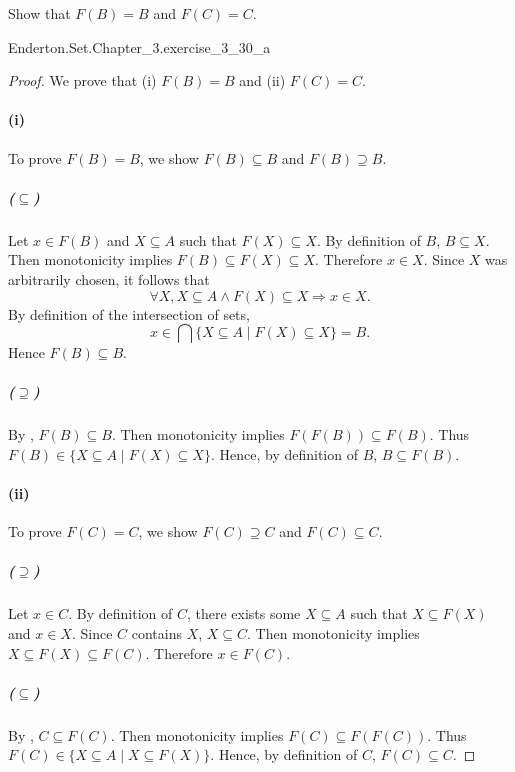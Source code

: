 \documentclass{report}
\begin{document}
  Show that $F(B) = B$ and $F(C) = C$.

    {Enderton.Set.Chapter\_3.exercise\_3\_30\_a}

  \begin{proof}

    We prove that (i) $F(B) = B$ and (ii) $F(C) = C$.

    \paragraph{(i)}%

      To prove $F(B) = B$, we show $F(B) \subseteq B$ and $F(B) \supseteq B$.

      \subparagraph{($\subseteq$)}%

        Let $x \in F(B)$ and $X \subseteq A$ such that $F(X) \subseteq X$.
        By definition of $B$, $B \subseteq X$.
        Then monotonicity implies $F(B) \subseteq F(X) \subseteq X$.
        Therefore $x \in X$.
        Since $X$ was arbitrarily chosen, it follows that
          $$\forall X, X \subseteq A \land F(X) \subseteq X \Rightarrow
            x \in X.$$
        By definition of the intersection of sets,
          $$x \in \bigcap\{X \subseteq A \mid F(X) \subseteq X\} = B.$$
        Hence $F(B) \subseteq B$.

      \subparagraph{($\supseteq$)}%

        By , $F(B) \subseteq B$.
        Then monotonicity implies $F(F(B)) \subseteq F(B)$.
        Thus $F(B) \in \{X \subseteq A \mid F(X) \subseteq X\}$.
        Hence, by definition of $B$, $B \subseteq F(B)$.

    \paragraph{(ii)}%

      To prove $F(C) = C$, we show $F(C) \supseteq C$ and $F(C) \subseteq C$.

      \subparagraph{($\supseteq$)}%

        Let $x \in C$.
        By definition of $C$, there exists some $X \subseteq A$ such that
          $X \subseteq F(X)$ and $x \in X$.
        Since $C$ contains $X$, $X \subseteq C$.
        Then monotonicity implies $X \subseteq F(X) \subseteq F(C)$.
        Therefore $x \in F(C)$.

      \subparagraph{($\subseteq$)}%

        By , $C \subseteq F(C)$.
        Then monotonicity implies $F(C) \subseteq F(F(C))$.
        Thus $F(C) \in \{X \subseteq A \mid X \subseteq F(X)\}$.
        Hence, by definition of $C$, $F(C) \subseteq C$.

  \end{proof}
\end{document}
